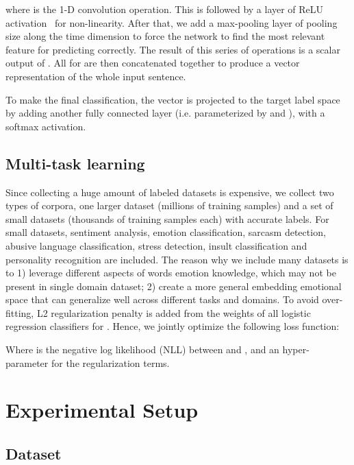 \documentclass[11pt,a4paper]{article}
\begin{document}
where  is the 1-D convolution operation. This is followed by a layer of ReLU activation~\cite{Nair2010} for non-linearity. After that, we add a max-pooling layer of pooling size  along the time dimension to force the network to find the most relevant feature for predicting  correctly. The result of this series of operations is a scalar output of . All  for  are then concatenated together to produce a vector representation  of the whole input sentence.


To make the final classification, the vector  is projected to the target label space by adding another fully connected layer (i.e. parameterized by  and ), with a softmax activation. 

 


\subsection{Multi-task learning}

Since collecting a huge amount of labeled datasets is expensive, we collect two types of corpora, one larger dataset (millions of training samples) and a set of small datasets (thousands of training samples each) with accurate labels. For  small datasets, sentiment analysis, emotion classification, sarcasm detection, abusive language classification, stress detection, insult classification and personality recognition are included. The reason why we include many datasets is to 1) leverage different aspects of words emotion knowledge, which may not be present in single domain dataset; 2) create a more general embedding emotional space that can generalize well  across different tasks and domains. To avoid over-fitting, L2 regularization penalty is added from the weights of all logistic regression classifiers  for . Hence, we jointly optimize the following loss function:

Where  is the negative log likelihood (NLL) between  and , and  an hyper-parameter for the regularization terms. 

\section{Experimental Setup}
\subsection{Dataset}
\end{document}
